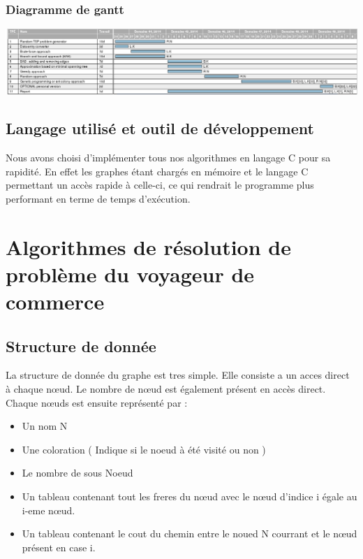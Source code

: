 \documentclass[10pt,a4paper]{report}
\begin{document}
		\subsubsection{Diagramme de gantt}
		
			\includegraphics[scale=0.37]{./Ressource/planning_AA.png}
		
	
	\subsection{Langage utilisé et outil de développement}
	\begin{flushleft}
	Nous avons choisi d'implémenter tous nos algorithmes en langage C  pour sa rapidité. En effet les graphes étant chargés en mémoire et le langage C permettant un accès rapide à celle-ci, ce qui rendrait le programme plus performant en terme de temps d'exécution.
	\end{flushleft}
	
\section{Algorithmes de résolution de problème du voyageur de commerce}

	\subsection{Structure de donnée}
	La structure de donnée du graphe est tres simple. Elle consiste a un acces direct à chaque nœud. Le nombre de nœud est également présent en accès direct.
	Chaque nœuds est ensuite représenté par : 
	\begin{itemize}
		\item Un nom N
		\item Une coloration ( Indique si le noeud à été visité ou non )
		\item Le nombre de sous Noeud
		\item Un tableau contenant tout les freres du nœud avec le nœud d'indice i égale au i-eme nœud.
		\item Un tableau contenant le cout du chemin entre le noued N courrant et le nœud présent en case i.
	\end{itemize}
	
\end{document}
